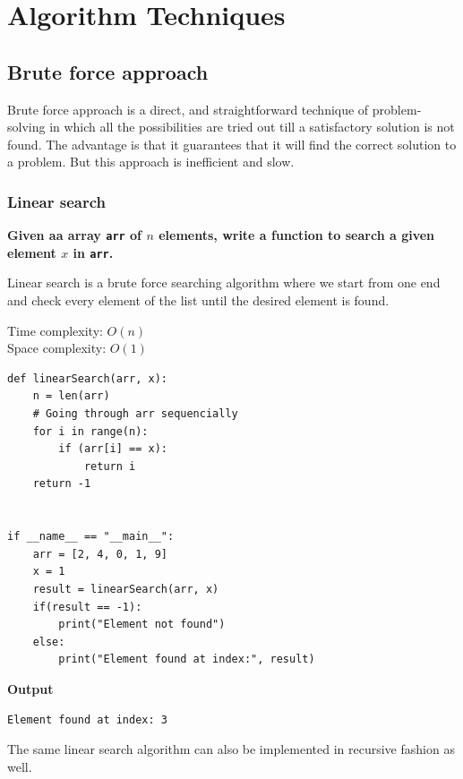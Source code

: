 \documentclass[a4paper,11pt]{book}
\begin{document}
\newpage
\chapter{Algorithm Techniques}

\section{Brute force approach}

\noindent Brute force approach is a direct, and straightforward technique of problem-solving in which all the possibilities are tried out till a satisfactory solution is not found. The advantage is that it guarantees that it will find the correct solution to a problem. But this approach is inefficient and slow.

\subsection{Linear search}
\textbf{Given aa array \lstinline{arr} of $n$ elements, write a function to search a given element $x$ in \lstinline{arr}.}
\vspace{5mm}

\noindent Linear search is a brute force searching algorithm where we start from one end and check every element of the list until the desired element is found. 

\vspace{5mm}

\noindent Time complexity: $O(n)$\\
\noindent Space complexity: $O(1)$

\begin{lstlisting}
def linearSearch(arr, x):
    n = len(arr)
    # Going through arr sequencially
    for i in range(n):
        if (arr[i] == x):
            return i
    return -1


if __name__ == "__main__":
    arr = [2, 4, 0, 1, 9]
    x = 1
    result = linearSearch(arr, x)
    if(result == -1):
        print("Element not found")
    else:
        print("Element found at index:", result)
\end{lstlisting}
\textbf{Output}
\begin{lstlisting}
Element found at index: 3
\end{lstlisting}

\noindent The same linear search algorithm can also be implemented in recursive fashion as well.

\vspace{5mm}
\end{document}
